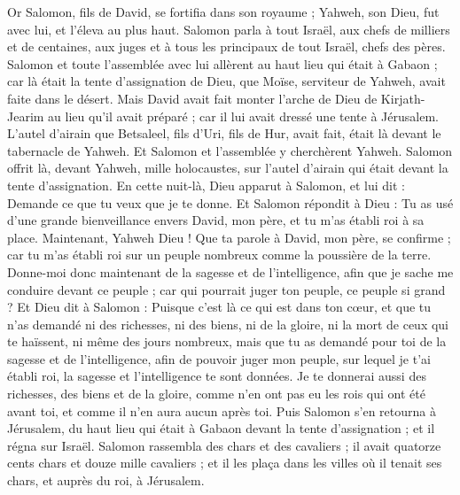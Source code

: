 \begin{multicols}{2}
\VerseOne{}Or Salomon, fils de David, se fortifia dans son royaume ; Yahweh, son Dieu, fut avec lui, et l'éleva au plus haut.
Salomon parla à tout Israël, aux chefs de milliers et de centaines, aux juges et à tous les principaux de tout Israël, chefs des pères.
Salomon et toute l'assemblée avec lui allèrent au haut lieu qui était à Gabaon ; car là était la tente d'assignation de Dieu, que Moïse, serviteur de Yahweh, avait faite dans le désert.
Mais David avait fait monter l'arche de Dieu de Kirjath-Jearim au lieu qu'il avait préparé ; car il lui avait dressé une tente à Jérusalem.
L'autel d'airain que Betsaleel, fils d'Uri, fils de Hur, avait fait, était là devant le tabernacle de Yahweh. Et Salomon et l'assemblée y cherchèrent Yahweh.
Salomon offrit là, devant Yahweh, mille holocaustes, sur l'autel d'airain qui était devant la tente d'assignation.
En cette nuit-là, Dieu apparut à Salomon, et lui dit : Demande ce que tu veux que je te donne.
Et Salomon répondit à Dieu : Tu as usé d'une grande bienveillance envers David, mon père, et tu m'as établi roi à sa place.
Maintenant, Yahweh Dieu ! Que ta parole à David, mon père, se confirme ; car tu m'as établi roi sur un peuple nombreux comme la poussière de la terre.
Donne-moi donc maintenant de la sagesse et de l'intelligence, afin que je sache me conduire devant ce peuple ; car qui pourrait juger ton peuple, ce peuple si grand ?
Et Dieu dit à Salomon : Puisque c'est là ce qui est dans ton cœur, et que tu n'as demandé ni des richesses, ni des biens, ni de la gloire, ni la mort de ceux qui te haïssent, ni même des jours nombreux, mais que tu as demandé pour toi de la sagesse et de l'intelligence, afin de pouvoir juger mon peuple, sur lequel je t'ai établi roi,
la sagesse et l'intelligence te sont données. Je te donnerai aussi des richesses, des biens et de la gloire, comme n'en ont pas eu les rois qui ont été avant toi, et comme il n'en aura aucun après toi.
Puis Salomon s'en retourna à Jérusalem, du haut lieu qui était à Gabaon devant la tente d'assignation ; et il régna sur Israël.
Salomon rassembla des chars et des cavaliers ; il avait quatorze cents chars et douze mille cavaliers ; et il les plaça dans les villes où il tenait ses chars, et auprès du roi, à Jérusalem.

\end{multicols}
